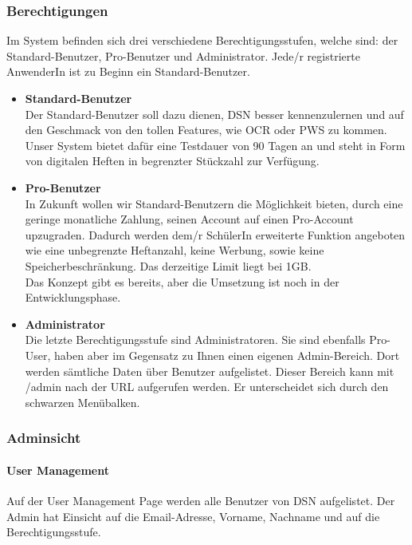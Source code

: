 \subsubsection{Berechtigungen}
Im System befinden sich drei verschiedene Berechtigungsstufen, welche sind: der Standard-Benutzer, Pro-Benutzer und Administrator. Jede/r registrierte AnwenderIn ist zu Beginn ein Standard-Benutzer.\\

\begin{itemize}
\item \textbf{Standard-Benutzer}\\ Der Standard-Benutzer soll dazu dienen, DSN besser kennenzulernen und auf den Geschmack von den tollen Features, wie OCR oder PWS zu kommen. Unser System bietet dafür eine Testdauer von 90 Tagen an und steht in Form von digitalen Heften in begrenzter Stückzahl zur Verfügung.
\item \textbf{Pro-Benutzer}\\ In Zukunft wollen wir Standard-Benutzern die Möglichkeit bieten, durch eine geringe monatliche Zahlung, seinen Account auf einen Pro-Account upzugraden. Dadurch werden dem/r SchülerIn erweiterte Funktion angeboten wie eine unbegrenzte Heftanzahl, keine Werbung, sowie keine Speicherbeschränkung. Das derzeitige Limit liegt bei 1GB.\\
Das Konzept gibt es bereits, aber die Umsetzung ist noch in der Entwicklungsphase.
\item \textbf{Administrator}\\ Die letzte Berechtigungsstufe sind Administratoren. Sie sind ebenfalls Pro-User, haben aber im Gegensatz zu Ihnen einen eigenen Admin-Bereich. Dort werden sämtliche Daten über Benutzer aufgelistet. Dieser Bereich kann mit /admin nach der URL aufgerufen werden. Er unterscheidet sich durch den schwarzen Menübalken.
\end{itemize}

\subsubsection{Adminsicht}
\paragraph{User Management}
Auf der User Management Page werden alle Benutzer von DSN aufgelistet. Der Admin hat Einsicht auf die Email-Adresse, Vorname, Nachname und auf die Berechtigungsstufe.

